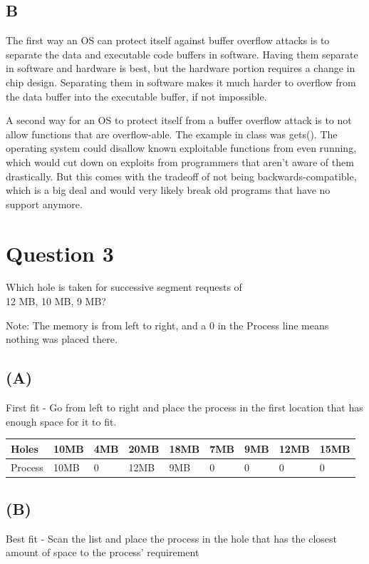 \documentclass[12pt]{article}
\begin{document}
	\subsection*{B}
	The first way an OS can protect itself against buffer overflow attacks is to separate the data and executable code buffers in software. Having them separate in software and hardware is best, but the hardware portion requires a change in chip design. Separating them in software makes it much harder to overflow from the data buffer into the executable buffer, if not impossible. 
	
	A second way for an OS to protect itself from a buffer overflow attack is to not allow functions that are overflow-able. The example in class was gets(). The operating system could disallow known exploitable functions from even running, which would cut down on exploits from programmers that aren't aware of them drastically. But this comes with the tradeoff of not being backwards-compatible, which is a big deal and would very likely break old programs that have no support anymore. 
	
	
	\section*{Question 3}
	Which hole is taken for successive segment requests of\\
	12 MB, 10 MB, 9 MB?
	
	Note: The memory is from left to right, and a 0 in the Process line means nothing was placed there.
			
	\subsection*{(A)}
	First fit - Go from left to right and place the process in the first location that has enough space for it to fit.
	
	\begin{tabular}[c]{| l | l | l | l | l | l | l | l | l |}
		\hline
		Holes & 10MB & 4MB & 20MB & 18MB & 7MB & 9MB & 12MB & 15MB \\
		\hline
		Process & 10MB & 0 & 12MB & 9MB & 0 & 0 & 0 & 0 \\
		\hline
	\end{tabular}
	
	\subsection*{(B)}
	Best fit - Scan the list and place the process in the hole that has the closest amount of space to the process' requirement
	
\end{document}
